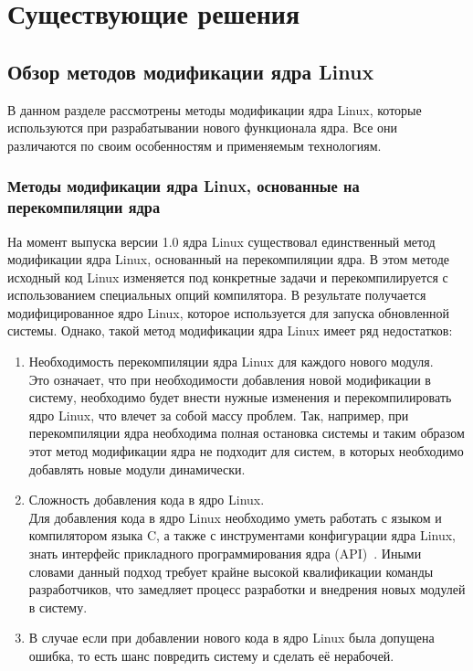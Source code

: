 \section{Существующие решения}\label{ch:--}
\subsection{Обзор методов модификации ядра Linux}\label{sec:----linux}

В данном разделе рассмотрены методы модификации ядра Linux,
которые используются при разрабатывании нового функционала ядра.
Все они различаются по своим особенностям и применяемым технологиям.

\subsubsection{Методы модификации ядра Linux, основанные на перекомпиляции ядра}\label{subsec:---linux----}

На момент выпуска версии 1.0 ядра Linux существовал единственный метод модификации ядра Linux, основанный на перекомпиляции ядра.
В этом методе исходный код Linux изменяется под конкретные задачи и перекомпилируется с использованием специальных опций компилятора.
В результате получается модифицированное ядро Linux, которое используется для запуска обновленной системы.
Однако, такой метод модификации ядра Linux имеет ряд недостатков:
\begin{enumerate}
    \item Необходимость перекомпиляции ядра Linux для каждого нового модуля. \vspace{1mm}\\
    Это означает, что при необходимости добавления новой модификации в систему, необходимо будет внести нужные изменения и перекомпилировать ядро Linux, что влечет за собой массу проблем.
    Так, например, при перекомпиляции ядра необходима полная остановка системы и таким образом этот метод модификации ядра не подходит для систем, в которых необходимо добавлять новые модули динамически.
    \item Сложность добавления кода в ядро Linux. \vspace{1mm}\\
    Для добавления кода в ядро Linux необходимо уметь работать с языком и компилятором языка C, а также с инструментами конфигурации ядра Linux, знать интерфейс прикладного программирования ядра (API)~\cite{API-linux}.
    Иными словами данный подход требует крайне высокой квалификации команды разработчиков, что замедляет процесс разработки и внедрения новых модулей в систему.
    \item В случае если при добавлении нового кода в ядро Linux была допущена ошибка, то есть шанс повредить систему и сделать её нерабочей.
\end{enumerate}

